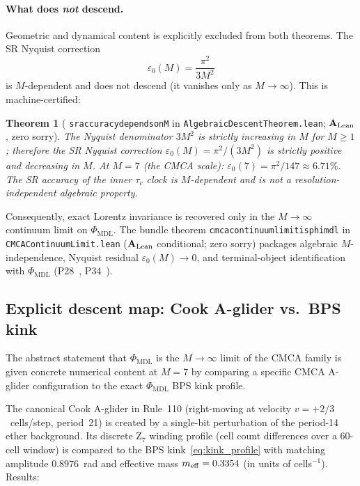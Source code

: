 \documentclass[11pt]{article}
\newtheorem{theorem}{Theorem}[section]
\theoremstyle{remark}
\newcommand{\PHIMDL}{\Phi_{\mathrm{MDL}}}
\newcommand{\lean}[1]{%
  \penalty-100
  \begingroup\def\_{\textunderscore\allowbreak}\texttt{#1}\endgroup}
\newcommand{\epsz}{\varepsilon_0}
\newcommand{\CatAL}{\ensuremath{\textbf{A}_{\rm Lean}}}
\begin{document}


\paragraph{What does \emph{not} descend.}
Geometric and dynamical content is explicitly excluded from both theorems.
The SR Nyquist correction
\begin{equation}
  \epsz(M) = \frac{\pi^2}{3M^2}
\end{equation}
is $M$-dependent and does not descend (it vanishes only as $M\to\infty$).
This is machine-certified:

\begin{theorem}[\lean{sr\_accuracy\_depends\_on\_M} in
  \lean{AlgebraicDescentTheorem.lean}; $\CatAL$, zero sorry]
\label{thm:sr_accuracy_m}
The Nyquist denominator $3M^2$ is strictly increasing in $M$ for $M\geq1$;
therefore the SR Nyquist correction $\epsz(M)=\pi^2/(3M^2)$ is strictly
positive and decreasing in $M$.
At $M=7$ (the CMCA scale): $\epsz(7)=\pi^2/147\approx 6.71\%$.
The SR accuracy of the inner $\tau_c$ clock is $M$-dependent and is
\emph{not} a resolution-independent algebraic property.
\end{theorem}

Consequently, exact Lorentz invariance is recovered only in the
$M\to\infty$ continuum limit on $\PHIMDL$.  The bundle theorem
\lean{cmca\_continuum\_limit\_is\_phimdl} in \lean{CMCAContinuumLimit.lean}
($\CatAL$ conditional; zero sorry) packages algebraic $M$-independence,
Nyquist residual $\epsz(M)\to0$, and terminal-object identification
with $\PHIMDL$ (P28~\cite{SpivackCompUniversality},
P34~\cite{SpivackGTEMobius}).

\subsection{Explicit descent map: Cook A-glider vs.\ BPS kink}
\label{ssec:descent_explicit}

The abstract statement that $\PHIMDL$ is the $M\to\infty$ limit of the CMCA family
is given concrete numerical content at $M=7$ by comparing a specific CMCA A-glider
configuration to the exact $\PHIMDL$ BPS kink profile.

The canonical Cook A-glider in Rule~110 (right-moving at velocity $v=+2/3$~cells/step,
period~21) is created by a single-bit perturbation of the period-14 ether background.
Its discrete Z$_7$ winding profile (cell count differences over a 60-cell window) is
compared to the BPS kink~\eqref{eq:kink_profile} with matching amplitude $0.8976$~rad
and effective mass $m_{\rm eff}=0.3354$ (in units of cells$^{-1}$).  Results:
\end{document}
